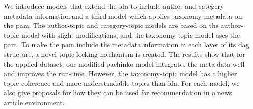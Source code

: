 We introduce models that extend the \gls{lda} to include author and category metadata information and a third model which applies taxonomy metadata on the \gls{pam}.
The author-topic and category-topic models are based on the author-topic model with slight modifications, and the taxonomy-topic model uses the \gls{pam}.
To make the \gls{pam} include the metadata information in each layer of its \gls{dag} structure, a novel topic locking mechanism is created.
The results show that for the applied dataset, our modified pachinko model integrates the meta-data well and improves the run-time.
However, the taxonomy-topic model has a higher topic coherence and more understandable topics than \gls{lda}.
For each model, we also give proposals for how they can be used for recommendation in a news article environment.
